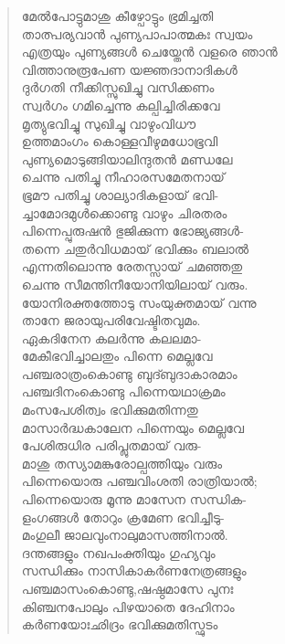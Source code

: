 \begin{verse}
മേല്‍പോട്ടുമാശു കീഴ്പോട്ടും ഭ്രമിച്ചതി\\
താത്പര്യവാന്‍ പുണ്യപാപാത്മകഃ സ്വയം\\
എത്രയും പുണ്യങ്ങള്‍ ചെയ്തേന്‍ വളരെ ഞാന്‍\\
വിത്താനുരൂപേണ യജ്ഞദാനാദികള്‍\\
ദുര്‍ഗതി നീക്കിസ്സുഖിച്ചു വസിക്കണം\\
സ്വര്‍ഗം ഗമിച്ചെന്നു കല്പിച്ചിരിക്കവേ\\
മൃത്യുഭവിച്ചു സുഖിച്ചു വാഴുംവിധൗ\\
ഉത്തമാംഗം കൊള്ളവീഴുമധോഭൂവി\\
പുണ്യമൊടുങ്ങിയാലിന്ദുതന്‍ മണ്ഡലേ\\
ചെന്നു പതിച്ചു നീഹാരസമേതനായ്\\
ഭൂമൗ പതിച്ചു ശാല്യാദികളായ് ഭവി-\\
ച്ചാമോദമുള്‍ക്കൊണ്ടു വാഴും ചിരതരം\\
പിന്നെപ്പുരുഷന്‍ ഭുജിക്കുന്ന ഭോജ്യങ്ങള്‍-\\
തന്നെ ചതുര്‍വിധമായ് ഭവിക്കും ബലാല്‍\\
എന്നതിലൊന്നു രേതസ്സായ് ചമഞ്ഞതു\\
ചെന്നു സീമന്തിനീയോനിയിലായ് വരും.\\
യോനിരക്തത്തോടു സംയുക്തമായ് വന്നു\\
താനേ ജരായുപരിവേഷ്ടിതവുമം.\\
ഏകദിനേന കലര്‍ന്നു കലലമാ-\\
മേകീഭവിച്ചാലതും പിന്നെ മെല്ലവേ\\
പഞ്ചരാത്രംകൊണ്ടു ബുദ്ബുദാകാരമാം\\
പഞ്ചദിനംകൊണ്ടു പിന്നെയഥാക്രമം\\
മംസപേശിത്വം ഭവിക്കുമതിന്നതു\\
മാസാര്‍ദ്ധകാലേന പിന്നെയും മെല്ലവേ\\
പേശിരുധിര പരിപ്ലുതമായ് വരു-\\
മാശു തസ്യാമങ്കുരോല്പത്തിയും വരും\\
പിന്നെയൊരു പഞ്ചവിംശതി രാത്രിയാല്‍;\\
പിന്നെയൊരു മൂന്നു മാസേന സന്ധിക-\\
ളംഗങ്ങള്‍ തോറും ക്രമേണ ഭവിച്ചീടു-\\
മംഗുലീ ജാലവുംനാലുമാസത്തിനാല്‍.\\
ദന്തങ്ങളും നഖപംക്തിയും ഗുഹ്യവും\\
സന്ധിക്കും നാസികാകര്‍ണനേത്രങ്ങളും\\
പഞ്ചമാസംകൊണ്ടു,ഷഷ്ഠമാസേ പുനഃ\\
കിഞ്ചനപോലും പിഴയാതെ ദേഹിനാം\\
കര്‍ണയോഃഛിദ്രം ഭവിക്കുമതിസ്ഫുടം\\

\end{verse}
